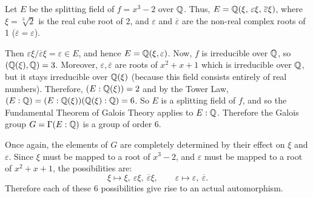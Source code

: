 \begin{example}
	Let $E$ be the splitting field of $f = x^3 - 2$ over $\mathbb{Q}$. Thus, $E = \mathbb{Q}(\xi,\, \varepsilon \xi,\, \overline{\varepsilon} \xi)$, where $\xi = \sqrt[3]{2}$ is the real cube root of 2, and $\varepsilon$ and $\overline{\varepsilon}$ are the non-real complex roots of 1 ($\overline{\varepsilon} = \varepsilon$).
	
	Then $\varepsilon \xi / \overline{\varepsilon} \xi = \varepsilon \in E$, and hence $E = \mathbb{Q}(\xi, \varepsilon)$. Now, $f$ is irreducible over $\mathbb{Q}$, so $(\mathbb{Q}(\xi), \mathbb{Q}) = 3$. Moreover, $\varepsilon, \overline{\varepsilon}$ are roots of $x^2 + x + 1$ which is irreducible over $\mathbb{Q}$, but it stays irreducible over $\mathbb{Q}(\xi)$ (because this field consists entirely of real numbers). Therefore, $(E : \mathbb{Q}(\xi)) = 2$ and by the Tower Law, $(E : \mathbb{Q}) = (E : \mathbb{Q}(\xi))(\mathbb{Q}(\xi) : \mathbb{Q}) = 6$. So $E$ is a splitting field of $f$, and so the Fundamental Theorem of Galois Theory applies to $E : \mathbb{Q}$. Therefore the Galois group $G = \Gamma(E : \mathbb{Q})$ is a group of order 6.
	
	Once again, the elements of $G$ are completely determined by their effect on $\xi$ and $\varepsilon$. Since $\xi$ must be mapped to a root of $x^3 - 2$, and $\varepsilon$ must be mapped to a root of $x^2 + x + 1$, the possibilities are:
	\[
		\xi \mapsto \xi,\ \varepsilon \xi,\ \overline{\varepsilon} \xi, \qquad \varepsilon \mapsto \varepsilon,\ \overline{\varepsilon}.
	\]
	Therefore each of these 6 possibilities give rise to an actual automorphism.
\end{example}
